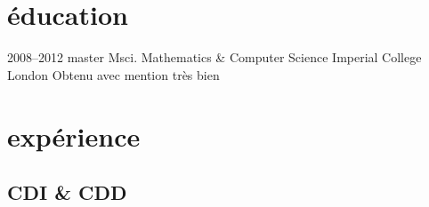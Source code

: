 \documentclass[]{friggeri-cv} %
\begin{document}

\section{éducation}

\begin{entrylist}


\entry
{2008--2012}
{master {\normalfont Msci. Mathematics \& Computer Science}}
{Imperial College London}
{Obtenu avec mention très bien}


\end{entrylist}


\section{expérience}

\subsection{CDI \& CDD}
\end{document}
